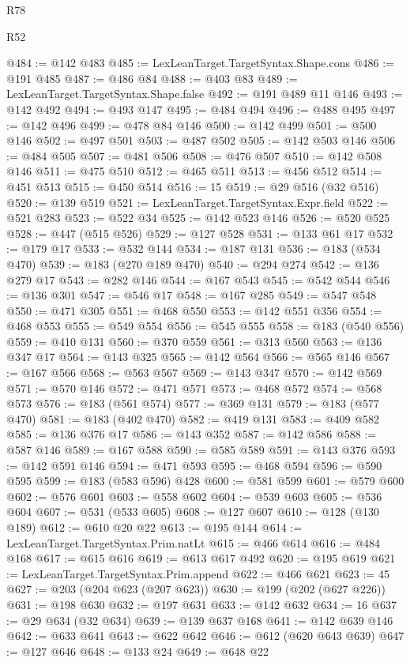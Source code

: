 \begin{lexlean}{R78}
\begin{lexlean}{R52}
\begin{coremodule}
{{{{{{{{{{{{{{{{{{{{{{{{{{{{{{{{{{{{{{{{{{{{{{{{{{{{{{{{{{{{{{{{{{{{{{{{{{{{{{{{{{{{{{{{{{{{{{{{{{{{{{{{{{{{{{{{{{{{{{{{{{{{{{{{{{{{{{{{{{{{{{{{{{{{{{{{{{{{{{{{{{{{{{{{{{{{{{{{{{{{{{{{{{{{{{{{{{{{{{@484 := @142 @483
@485 := LexLeanTarget.TargetSyntax.Shape.cons
@486 := @191 @485
@487 := @486 @84
@488 := @403 @83
@489 := LexLeanTarget.TargetSyntax.Shape.false
@492 := @191 @489 @11 @146
@493 := @142 @492
@494 := @493 @147
@495 := @484 @494
@496 := @488 @495
@497 := @142 @496
@499 := @478 @84 @146
@500 := @142 @499
@501 := @500 @146
@502 := @497 @501
@503 := @487 @502
@505 := @142 @503 @146
@506 := @484 @505
@507 := @481 @506
@508 := @476 @507
@510 := @142 @508 @146
@511 := @475 @510
@512 := @465 @511
@513 := @456 @512
@514 := @451 @513
@515 := @450 @514
@516 := 15
@519 := @29 @516 (@32 @516)
@520 := @139 @519
@521 := LexLeanTarget.TargetSyntax.Expr.field
@522 := @521 @283
@523 := @522 @34
@525 := @142 @523 @146
@526 := @520 @525
@528 := @447 (@515 @526)
@529 := @127 @528
@531 := @133 @61 @17
@532 := @179 @17
@533 := @532 @144
@534 := @187 @131
@536 := @183 (@534 @470)
@539 := @183 (@270 @189 @470)
@540 := @294 @274
@542 := @136 @279 @17
@543 := @282 @146
@544 := @167 @543
@545 := @542 @544
@546 := @136 @301
@547 := @546 @17
@548 := @167 @285
@549 := @547 @548
@550 := @471 @305
@551 := @468 @550
@553 := @142 @551 @356
@554 := @468 @553
@555 := @549 @554
@556 := @545 @555
@558 := @183 (@540 @556)
@559 := @410 @131
@560 := @370 @559
@561 := @313 @560
@563 := @136 @347 @17
@564 := @143 @325
@565 := @142 @564
@566 := @565 @146
@567 := @167 @566
@568 := @563 @567
@569 := @143 @347
@570 := @142 @569
@571 := @570 @146
@572 := @471 @571
@573 := @468 @572
@574 := @568 @573
@576 := @183 (@561 @574)
@577 := @369 @131
@579 := @183 (@577 @470)
@581 := @183 (@402 @470)
@582 := @419 @131
@583 := @409 @582
@585 := @136 @376 @17
@586 := @143 @352
@587 := @142 @586
@588 := @587 @146
@589 := @167 @588
@590 := @585 @589
@591 := @143 @376
@593 := @142 @591 @146
@594 := @471 @593
@595 := @468 @594
@596 := @590 @595
@599 := @183 (@583 @596) @428
@600 := @581 @599
@601 := @579 @600
@602 := @576 @601
@603 := @558 @602
@604 := @539 @603
@605 := @536 @604
@607 := @531 (@533 @605)
@608 := @127 @607
@610 := @128 (@130 @189)
@612 := @610 @20 @22
@613 := @195 @144
@614 := LexLeanTarget.TargetSyntax.Prim.natLt
@615 := @466 @614
@616 := @484 @168
@617 := @615 @616
@619 := @613 @617 @492
@620 := @195 @619
@621 := LexLeanTarget.TargetSyntax.Prim.append
@622 := @466 @621
@623 := 45
@627 := @203 (@204 @623 (@207 @623))
@630 := @199 (@202 (@627 @226))
@631 := @198 @630
@632 := @197 @631
@633 := @142 @632
@634 := 16
@637 := @29 @634 (@32 @634)
@639 := @139 @637 @168
@641 := @142 @639 @146
@642 := @633 @641
@643 := @622 @642
@646 := @612 (@620 @643 @639)
@647 := @127 @646
@648 := @133 @24
@649 := @648 @22
}}}}}}}}}}}}}}}}}}}}}}}}}}}}}}}}}}}}}}}}}}}}}}}}}}}}}}}}}}}}}}}}}}}}}}}}}}}}}}}}}}}}}}}}}}}}}}}}}}}}}}}}}}}}}}}}}}}}}}}}}}}}}}}}}}}}}}}}}}}}}}}}}}}}}}}}}}}}}}}}}}}}}}}}}}}}}}}}}}}}}}}}}}}}}}}}}}}}}}
\end{coremodule}
\end{lexlean}
\end{lexlean}
